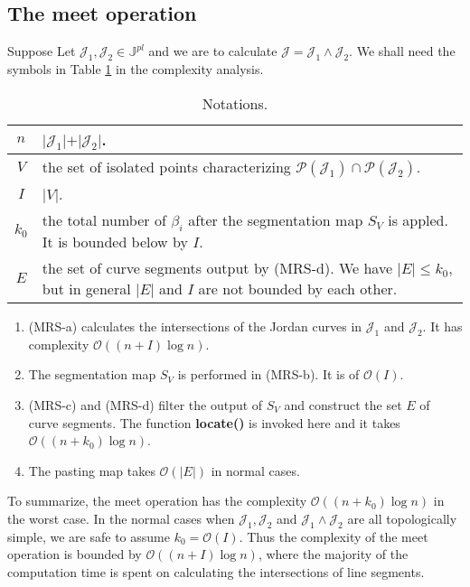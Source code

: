 \documentclass[a4paper]{article}
\newcommand{\bJpl}{\mathbb{J}^{pl}}
\newcommand{\cJ}{\mathcal{J}}
\newcommand{\bigO}[1]{\mathcal{O}(#1)}
\begin{document}
\subsection{The meet operation}
Suppose Let $\cJ_1, \cJ_2 \in \bJpl$ 
and we are to calculate $\cJ = \cJ_1 \wedge \cJ_2$. 
We shall need the symbols in Table \ref{tab:notation} in the complexity analysis. 

\begin{table}[htb]
  \centering
  \begin{tabular}{|c|l|}
  \hline
    $n$ & $\vert \cJ_1 \vert + \vert \cJ_2 \vert$.  \\
    \hline
    $V$ & the set of isolated points characterizing $\mathcal{P}(\cJ_1) \cap \mathcal{P}(\cJ_2)$.  \\
    \hline
    $I$ & $\vert V \vert$. \\
    \hline
    $k_0$ & \makecell[tl]{the total number of $\beta_i$ after the segmentation map $S_V$ is appled. \\
    It is bounded below by $I$.} \\
    \hline
    $E$ & \makecell[tl]{the set of curve segments output by (MRS-d). \\
    We have $\vert E\vert \le k_0$, 
    but in general $\vert E \vert$ and $I$ are not bounded by each other. }\\
    \hline
  \end{tabular}
  \caption{Notations. }
  \label{tab:notation}
\end{table}

\begin{enumerate}
\item (MRS-a) calculates the intersections of the Jordan curves in $\cJ_1$ and $\cJ_2$. 
It has complexity $\bigO{(n+I) \log n}$.
\item The segmentation map $S_V$ is performed in (MRS-b). It is of $\bigO{I}$.
\item (MRS-c) and (MRS-d) filter the output of $S_V$ and construct the set $E$ of curve segments. 
The function \textbf{locate()} is invoked here and it takes $\bigO{(n+k_0) \log n}$. 
\item The pasting map takes $\bigO{\vert E \vert}$ in normal cases. 
\end{enumerate}

To summarize, 
the meet operation has the complexity $\bigO{(n+k_0) \log n}$ in the worst case. 
In the normal cases when $\cJ_1, \cJ_2$ and $\cJ_1 \wedge \cJ_2$ are all topologically simple, 
we are safe to assume $k_0 = \bigO{I}$. 
Thus the complexity of the meet operation is bounded by $\bigO{(n+I) \log n}$, 
where the majority of the computation time 
is spent on calculating the intersections of line segments. 
\end{document}
